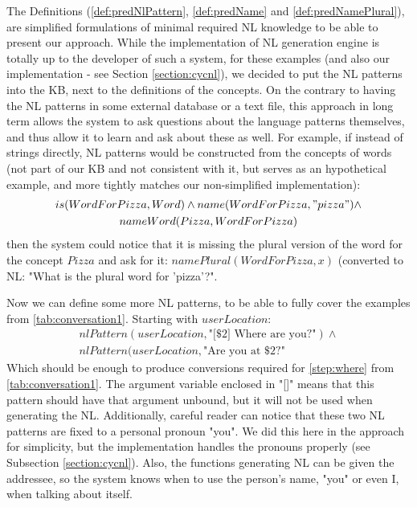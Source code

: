 The Definitions (\autoref{def:predNlPattern}, \autoref{def:predName} and
\autoref{def:predNamePlural}),
are simplified formulations of minimal required NL knowledge to be able to 
present our approach. While the implementation of NL generation engine is 
totally up to the developer of such a system, for these examples (and also 
our implementation - see Section \ref{section:cycnl}), we decided to 
put the NL patterns
into the KB, next to the definitions of the concepts. On the contrary to
having the NL patterns in some external database or a text file, this approach
in long term allows the system to ask questions about the language patterns
themselves, and thus allow it to learn and ask about these as well. For example,
if instead of strings directly, NL patterns would be constructed from the 
concepts of words (not part of our KB and not consistent with it, but serves 
as an hypothetical example, and more tightly matches our non-simplified 
implementation):
\begin{equation*}
\begin{gathered}
is(WordForPizza, Word) \land name(WordForPizza, "pizza")\land\\
nameWord(Pizza,WordForPizza)
\end{gathered}
\end{equation*}
then the system could notice that it is missing the plural version of the word
for the concept $Pizza$ and ask for it: $namePlural(WordForPizza,x)$ 
(converted to NL: "What is the plural word for 'pizza'?".

Now we can define some more NL patterns, to be able to fully cover the
examples from \autoref{tab:conversation1}. Starting with $userLocation$:
\begin{equation}\label{as:nl:userLocation}
\begin{gathered}
    nlPattern(userLocation,\text{"[\$2] Where are you?"}) \land \\
    nlPattern(userLocation,\text{"Are you at \$2?"}
\end{gathered}
\end{equation}
Which should be enough to produce conversions required for \autoref{step:where}
from \autoref{tab:conversation1}. The argument variable enclosed in "[]" means
that this pattern should have that argument unbound, but it will not be 
used when generating the NL. Additionally, careful reader can notice that these
two NL patterns are fixed to a personal pronoun "you". We did this here in the
approach for simplicity, but the implementation handles the pronouns properly
(see Subsection \ref{section:cycnl}). Also, the functions generating NL can be given
the addressee, so the system knows when to use the person's name, "you" or even
I, when talking about itself.

